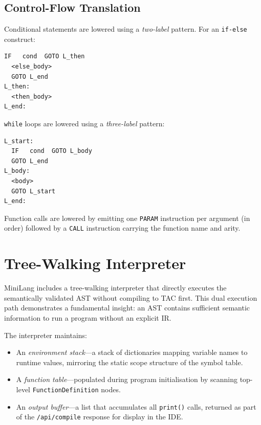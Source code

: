 \documentclass[conference]{IEEEtran}
\begin{document}
\subsection{Control-Flow Translation}

Conditional statements are lowered using a \textit{two-label} pattern.
For an \texttt{if-else} construct:

\begin{lstlisting}[language=TAC, caption={TAC translation of if-else},
                   label={lst:if_tac}, numbers=none]
  IF   cond  GOTO L_then
  <else_body>
  GOTO L_end
L_then:
  <then_body>
L_end:
\end{lstlisting}

\texttt{while} loops are lowered using a \textit{three-label} pattern:

\begin{lstlisting}[language=TAC, caption={TAC translation of while-loop},
                   label={lst:while_tac}, numbers=none]
L_start:
  IF   cond  GOTO L_body
  GOTO L_end
L_body:
  <body>
  GOTO L_start
L_end:
\end{lstlisting}

Function calls are lowered by emitting one \texttt{PARAM} instruction
per argument (in order) followed by a \texttt{CALL} instruction
carrying the function name and arity.

\section{Tree-Walking Interpreter}
\label{sec:interpreter}

MiniLang includes a tree-walking interpreter that directly executes the
semantically validated AST without compiling to TAC first. This dual
execution path demonstrates a fundamental insight: an AST contains
sufficient semantic information to run a program without an explicit IR.

The interpreter maintains:
\begin{itemize}
  \item An \textit{environment stack}---a stack of dictionaries mapping
        variable names to runtime values, mirroring the static scope
        structure of the symbol table.
  \item A \textit{function table}---populated during program
        initialisation by scanning top-level \texttt{FunctionDefinition}
        nodes.
  \item An \textit{output buffer}---a list that accumulates all
        \texttt{print()} calls, returned as part of the
        \texttt{/api/compile} response for display in the IDE.
\end{itemize}
\end{document}
